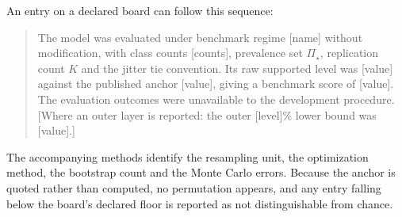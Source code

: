 \documentclass[11pt]{article}
\newcommand{\PSet}{\Pi_\star}
\theoremstyle{remark}
\begin{document}
An entry on a declared board can follow this sequence:
\begin{quote}
The model was evaluated under benchmark regime [name] without modification, with class counts [counts], prevalence set $\PSet$, replication count $K$ and the jitter tie convention. Its raw supported level was [value] against the published anchor [value], giving a benchmark score of [value]. The evaluation outcomes were unavailable to the development procedure. [Where an outer layer is reported: the outer [level]\% lower bound was [value].]
\end{quote}
The accompanying methods identify the resampling unit, the optimization method, the bootstrap count and the Monte Carlo errors. Because the anchor is quoted rather than computed, no permutation appears, and any entry falling below the board's declared floor is reported as not distinguishable from chance.
\end{document}
